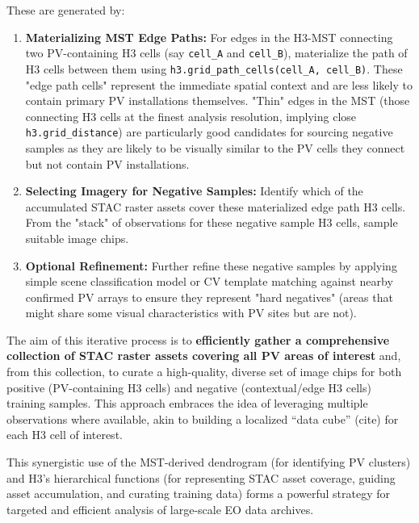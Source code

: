 \begin{enumerate}
\begin{enumerate}
\begin{itemize}
                These are generated by:
                    \begin{enumerate}
                        \item \textbf{Materializing MST Edge Paths:} For edges in the H3-MST connecting two PV-containing H3 cells (say \texttt{cell\_A} and \texttt{cell\_B}), materialize the path of H3 cells between them using \texttt{h3.grid\_path\_cells(cell\_A, cell\_B)}. These "edge path cells" represent the immediate spatial context and are less likely to contain primary PV installations themselves. 
                        "Thin" edges in the MST (those connecting H3 cells at the finest analysis resolution, implying close \texttt{h3.grid\_distance}) are particularly good candidates for sourcing negative samples as they are likely to be visually similar to the PV cells they connect but not contain PV installations.
                        \item \textbf{Selecting Imagery for Negative Samples:} Identify which of the accumulated STAC raster assets cover these materialized edge path H3 cells. From the "stack" of observations for these negative sample H3 cells, sample suitable image chips. 
                        \item \textbf{Optional Refinement:} Further refine these negative samples by applying simple scene classification model or CV template matching against nearby confirmed PV arrays to ensure they represent "hard negatives" 
                        (areas that might share some visual characteristics with PV sites but are not). 
                    \end{enumerate}
            \end{itemize}
        \end{enumerate}
        The aim of this iterative process is to \textbf{efficiently gather a comprehensive collection of STAC raster assets covering all PV areas of interest} and, from this collection, to curate a high-quality, diverse set of image chips for both 
        positive (PV-containing H3 cells) and negative (contextual/edge H3 cells) training samples. This approach embraces the idea of leveraging multiple observations where available, akin to building a localized ``data cube'' (cite) for each H3 cell of interest. 
\end{enumerate}
This synergistic use of the MST-derived dendrogram (for identifying PV clusters) and H3's hierarchical functions (for representing STAC asset coverage, guiding asset accumulation, and curating training data) 
forms a powerful strategy for targeted and efficient analysis of large-scale EO data archives.


\clearpage

